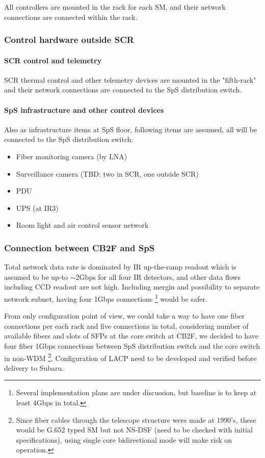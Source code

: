 \documentclass[a4paper,notitlepage]{article}
\begin{document}
All controllers are mounted in the rack for each SM, and their network 
connections are connected within the rack. 


\subsubsection{Control hardware outside SCR}

\paragraph{SCR control and telemetry}

SCR thermal control and other telemetry devices are mounted in the "fifth-rack" 
and their network connections are connected to the SpS distribution switch. 

\paragraph{SpS infrastructure and other control devices}

Also as infrastructure items at SpS floor, following items are assumed, 
all will be connected to the SpS distribution switch: 

\begin{itemize}
  \item Fiber monitoring camera (by LNA)
  \item Surveillance camera (TBD: two in SCR, one outside SCR)
  \item PDU
  \item UPS (at IR3)
  \item Room light and air control sensor network
\end{itemize}

\subsubsection{Connection between CB2F and SpS}

Total network data rate is dominated by IR up-the-ramp readout which 
is assumed to be up-to $\sim$2Gbps for all four IR detectors, 
and other data flows including CCD readout are not high. 
Including mergin and possibility to separate network subnet, having four 1Gbps 
connections
\footnote{Several implementation plans are under discussion, but baseline is 
to keep at least 4Gbps in total. } 
would be safer. 

From only configuration point of view, we could take a way to have one fiber 
connections per each rack and five connections in total, considering number 
of available fibers and slots of SFPs at the core switch at CB2F, 
we decided to have four fiber 1Gbps connections between SpS distribution 
switch and the core switch in non-WDM
\footnote{Since fiber cables through the telescope structure were made 
at 1990's, these would be G.652 typed SM but not NS-DSF (need to be checked 
with initial specifications), using single core bidirectional mode will 
make risk on operation.}. 
Configuration of LACP need to be developed and verified before delivery to 
Subaru. 
\end{document}

